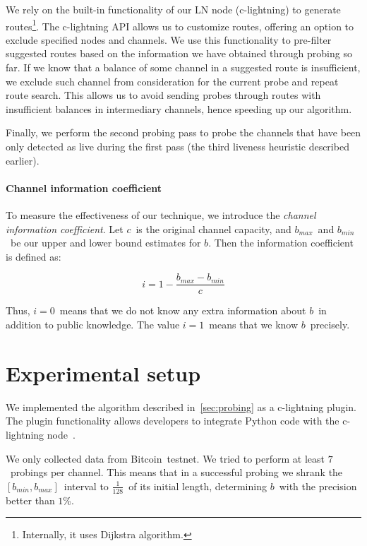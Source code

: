 We rely on the built-in functionality of our LN node (c-lightning) to generate routes\footnote{Internally, it uses Dijkstra algorithm.}.
The c-lightning API allows us to customize routes, offering an option to exclude specified nodes and channels.
We use this functionality to pre-filter suggested routes based on the information we have obtained through probing so far.
If we know that a balance of some channel in a suggested route is insufficient, we exclude such channel from consideration for the current probe and repeat route search.
This allows us to avoid sending probes through routes with insufficient balances in intermediary channels, hence speeding up our algorithm.

Finally, we perform the second probing pass to probe the channels that have been only detected as live during the first pass (the third liveness heuristic described earlier).

\paragraph{Channel information coefficient}
To measure the effectiveness of our technique, we introduce the \textit{channel information coefficient}.
Let $c$~is the original channel capacity, and $b_{max}$~and $b_{min}$~be our upper and lower bound estimates for $b$.
Then the information coefficient is defined as:

\[i = 1 - \frac{b_{max} - b_{min}}{c}\]

Thus, $i = 0$~means that we do not know any extra information about $b$~in addition to public knowledge.
The value $i = 1$~means that we know $b$~precisely.


\section{Experimental setup}

We implemented the algorithm described in~\cref{sec:probing} as a c-lightning plugin.
The plugin functionality allows developers to integrate Python code with the c-lightning node~\cite{clightningPlugins}.

We only collected data from Bitcoin~testnet.
We tried to perform at least $7$~probings per channel.
This means that in a successful probing we shrank the $[b_{min}, b_{max}]$~interval to $\frac{1}{128}$~of its initial length, determining $b$~with the precision better than $1$\%.

